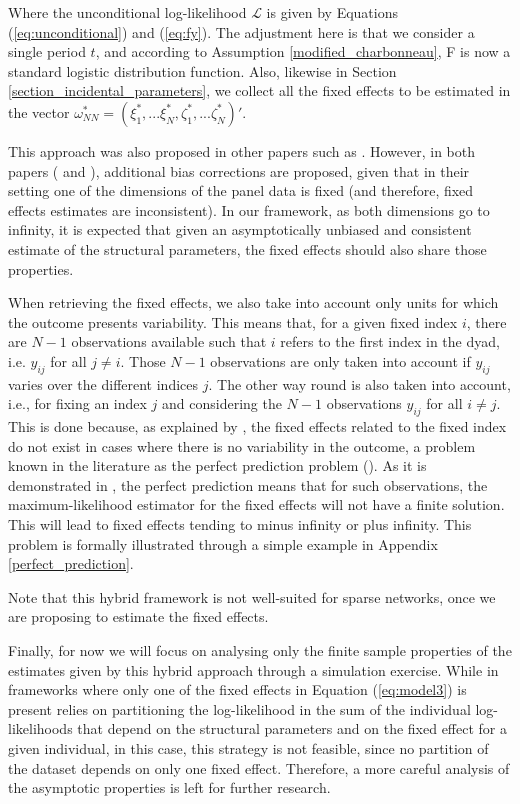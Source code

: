 Where the unconditional log-likelihood $\mathcal{L}$ is given by Equations (\ref{eq:unconditional}) and (\ref{eq:fy}). The adjustment here is that we consider a single period $t$, and according to Assumption \ref{modified_charbonneau}, F is now a standard logistic distribution function. Also, likewise in Section \ref{section_incidental_parameters}, we collect all the fixed effects to be estimated in the vector $\omega_{NN}^* = {(\xi_1^*, ... \xi_N^*, \zeta_1^*, ... \zeta_N^*)}'$.

This approach was also proposed in other papers such as \cite{bartolucci2019partial}. However, in both papers (\cite{martin2018bls} and \cite{bartolucci2019partial}), additional bias corrections are proposed, given that in their setting one of the dimensions of the panel data is fixed (and therefore, fixed effects estimates are inconsistent). In our framework, as both dimensions go to infinity, it is expected that given an asymptotically unbiased and consistent estimate of the structural parameters, the fixed effects should also share those properties.

When retrieving the fixed effects, we also take into account only units for which the outcome presents variability. This means that, for a given fixed index $i$, there are $N-1$ observations available such that $i$ refers to the first index in the dyad, i.e. $y_{ij}$ for all $j \neq i$. Those $N-1$ observations are only taken into account if $y_{ij}$ varies over the different indices $j$. The other way round is also taken into account, i.e., for fixing an index $j$ and considering the $N-1$ observations $y_{ij}$ for all $i \neq j$. This is done because, as explained by \cite{kunz2017estimating}, the fixed effects related to the fixed index do not exist in cases where there is no variability in the outcome, a problem known in the literature as the perfect prediction problem (\cite{maddala1983qualitative}). As it is demonstrated in \cite{kunz2017estimating}, the perfect prediction means that for such observations, the maximum-likelihood estimator for the fixed effects will not have a finite solution. This will lead to fixed effects tending to minus infinity or plus infinity. This problem is formally illustrated through a simple example in Appendix \ref{perfect_prediction}. 

Note that this hybrid framework is not well-suited for sparse networks, once we are proposing to estimate the fixed effects.

Finally, for now we will focus on analysing only the finite sample properties of the estimates given by this hybrid approach through a simulation exercise. While in frameworks where only one of the fixed effects in Equation (\ref{eq:model3}) is present relies on partitioning the log-likelihood in the sum of the individual log-likelihoods that depend on the structural parameters and on the fixed effect for a given individual, in this case, this strategy is not feasible, since no partition of the dataset depends on only one fixed effect. Therefore, a more careful analysis of the asymptotic properties is left for further research. 

